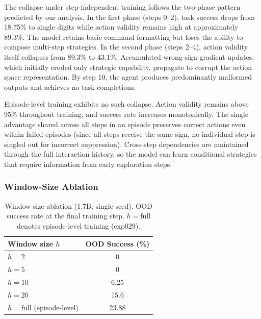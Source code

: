 
The collapse under step-independent training follows the two-phase pattern predicted by our analysis. In the first phase (steps 0--2), task success drops from 18.75\% to single digits while action validity remains high at approximately 89.3\%. The model retains basic command formatting but loses the ability to compose multi-step strategies. In the second phase (steps 2--4), action validity itself collapses from 89.3\% to 43.1\%. Accumulated wrong-sign gradient updates, which initially eroded only strategic capability, propagate to corrupt the action space representation. By step 10, the agent produces predominantly malformed outputs and achieves no task completions.

Episode-level training exhibits no such collapse. Action validity remains above 95\% throughout training, and success rate increases monotonically. The single advantage shared across all steps in an episode preserves correct actions even within failed episodes (since all steps receive the same sign, no individual step is singled out for incorrect suppression). Cross-step dependencies are maintained through the full interaction history, so the model can learn conditional strategies that require information from early exploration steps.

\subsubsection{Window-Size Ablation}
\label{sec:results_hsweep}

\begin{table}[t]
\centering
\caption{Window-size ablation (1.7B, single seed). OOD success rate at the final training step. $h = \text{full}$ denotes episode-level training (exp029).}
\label{tab:h_sweep}
\small
\begin{tabular}{@{}lc@{}}
\toprule
\textbf{Window size $h$} & \textbf{OOD Success (\%)} \\
\midrule
$h = 2$  & 0 \\
$h = 5$  & 0 \\
$h = 10$ & 6.25 \\
$h = 20$ & 15.6 \\
$h = \text{full}$ (episode-level) & 23.88 \\
\bottomrule
\end{tabular}
\end{table}

